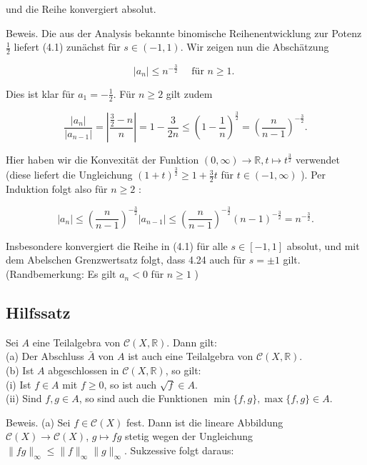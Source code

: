 \documentclass[10pt, letterpaper]{article}
\begin{document}
und die Reihe konvergiert absolut.

Beweis. Die aus der Analysis bekannte binomische Reihenentwicklung zur Potenz $\frac{1}{2}$ liefert (4.1) zunächst für $s \in(-1,1)$. Wir zeigen nun die Abschätzung

$$
\left|a_{n}\right| \leq n^{-\frac{3}{2}} \quad \text { für } n \geq 1 \text {. }
$$

Dies ist klar für $a_{1}=-\frac{1}{2}$. Für $n \geq 2$ gilt zudem

$$
\frac{\left|a_{n}\right|}{\left|a_{n-1}\right|}=\left|\frac{\frac{3}{2}-n}{n}\right|=1-\frac{3}{2 n} \leq\left(1-\frac{1}{n}\right)^{\frac{3}{2}}=\left(\frac{n}{n-1}\right)^{-\frac{3}{2}} .
$$

Hier haben wir die Konvexität der Funktion $(0, \infty) \rightarrow \mathbb{R}, t \mapsto t^{\frac{3}{2}}$ verwendet (diese liefert die Ungleichung $(1+t)^{\frac{3}{2}} \geq 1+\frac{3}{2} t$ für $t \in(-1, \infty)$ ). Per Induktion folgt also für $n \geq 2$ :

$$
\left|a_{n}\right| \leq\left(\frac{n}{n-1}\right)^{-\frac{3}{2}}\left|a_{n-1}\right| \leq\left(\frac{n}{n-1}\right)^{-\frac{3}{2}}(n-1)^{-\frac{3}{2}}=n^{-\frac{3}{2}} .
$$

Insbesondere konvergiert die Reihe in (4.1) für alle $s \in[-1,1]$ absolut, und mit dem Abelschen Grenzwertsatz folgt, dass 4.24 auch für $s= \pm 1$ gilt.\\
(Randbemerkung: Es gilt $a_{n}<0$ für $n \geq 1$ )

\subsection*{Hilfssatz}
Sei $A$ eine Teilalgebra von $\mathcal{C}(X, \mathbb{R})$. Dann gilt:\\
(a) Der Abschluss $\bar{A}$ von $A$ ist auch eine Teilalgebra von $\mathcal{C}(X, \mathbb{R})$.\\
(b) Ist $A$ abgeschlossen in $\mathcal{C}(X, \mathbb{R})$, so gilt:\\
(i) Ist $f \in A$ mit $f \geq 0$, so ist auch $\sqrt{f} \in A$.\\
(ii) Sind $f, g \in A$, so sind auch die Funktionen $\min \{f, g\}, \max \{f, g\} \in A$.

Beweis. (a) Sei $f \in \mathcal{C}(X)$ fest. Dann ist die lineare Abbildung $\mathcal{C}(X) \rightarrow \mathcal{C}(X)$, $g \mapsto f g$ stetig wegen der Ungleichung $\|f g\|_{\infty} \leq\|f\|_{\infty}\|g\|_{\infty}$. Sukzessive folgt daraus:
\end{document}
